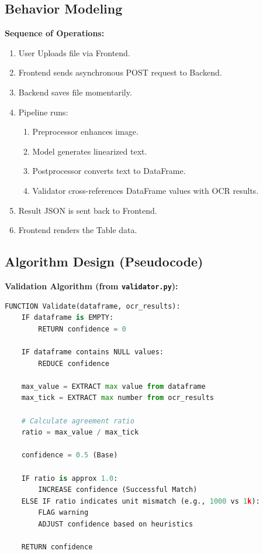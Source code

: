 \documentclass[12pt, a4paper]{article}
\begin{document}
\subsection{Behavior Modeling}
\textbf{Sequence of Operations:}
\begin{enumerate}
    \item User Uploads file via Frontend.
    \item Frontend sends asynchronous POST request to Backend.
    \item Backend saves file momentarily.
    \item Pipeline runs:
    \begin{enumerate}
        \item Preprocessor enhances image.
        \item Model generates linearized text.
        \item Postprocessor converts text to DataFrame.
        \item Validator cross-references DataFrame values with OCR results.
    \end{enumerate}
    \item Result JSON is sent back to Frontend.
    \item Frontend renders the Table data.
\end{enumerate}

\subsection{Algorithm Design (Pseudocode)}
\textbf{Validation Algorithm (from \texttt{validator.py}):}
\begin{lstlisting}[language=Python, frame=single, caption=Validation Logic]
FUNCTION Validate(dataframe, ocr_results):
    IF dataframe is EMPTY:
        RETURN confidence = 0

    IF dataframe contains NULL values:
        REDUCE confidence

    max_value = EXTRACT max value from dataframe
    max_tick = EXTRACT max number from ocr_results

    # Calculate agreement ratio
    ratio = max_value / max_tick

    confidence = 0.5 (Base)

    IF ratio is approx 1.0:
        INCREASE confidence (Successful Match)
    ELSE IF ratio indicates unit mismatch (e.g., 1000 vs 1k):
        FLAG warning
        ADJUST confidence based on heuristics

    RETURN confidence
\end{lstlisting}
\end{document}
